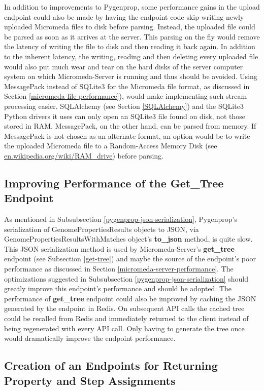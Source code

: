 In addition to improvements to Pygenprop, some performance gains in the upload endpoint could also be made by having the endpoint code skip writing newly uploaded Micromeda files to disk before parsing. Instead, the uploaded file could be parsed as soon as it arrives at the server. This parsing on the fly would remove the latency of writing the file to disk and then reading it back again. In addition to the inherent latency, the writing, reading and then deleting every uploaded file would also put much wear and tear on the hard disks of the server computer system on which Micromeda-Server is running and thus should be avoided. Using MessagePack instead of SQLite3 for the Micromeda file format, as discussed in Section \ref{micromeda-file-performance}), would make implementing such stream processing easier. SQLAlchemy (see Section \ref{SQLAlchemy}) and the SQLite3 Python drivers it uses can only open an SQLite3 file found on disk, not those stored in RAM. MessagePack, on the other hand, can be parsed from memory. If MessagePack is not chosen as an alternate format, an option would be to write the uploaded Micromeda file to a Random-Access Memory Disk (see \href{en.wikipedia.org/wiki/RAM\_drive}{en.wikipedia.org/wiki/RAM\_drive}) before parsing.

\subsection{Improving Performance of the Get\_Tree Endpoint}

As mentioned in Subsubsection \ref{pygenprop-json-serialization}, Pygenprop's serialization of GenomePropertiesResults objects to JSON, via GenomePropertiesResultsWithMatches object's \textbf{to\_json} method, is quite slow. This JSON serialization method is used by Micromeda-Server's \textbf{get\_tree} endpoint (see Subsection \ref{get-tree}) and maybe the source of the endpoint's poor performance as discussed in Section \ref{micromeda-server-performance}. The optimizations suggested in Subsubsection \ref{pygenprop-json-serialization} should greatly improve this endpoint's performance and should be adopted. The performance of \textbf{get\_tree} endpoint could also be improved by caching the JSON generated by the endpoint in Redis. On subsequent API calls the cached tree could be recalled from Redis and immediately returned to the client instead of being regenerated with every API call. Only having to generate the tree once would dramatically improve the endpoint performance.

\subsection{Creation of an Endpoints for Returning Property and Step Assignments}

